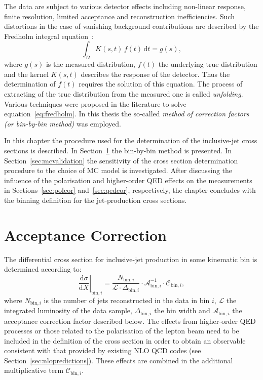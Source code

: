 The data are subject to various detector effects including non-linear response, finite resolution, limited acceptance and reconstruction inefficiencies. Such distortions in the case of vanishing background contributions are described by the Fredholm integral equation~\cite{Behnke:2013pga}:
\begin{equation}
 \int_\Omega K\left(s,t\right)\,f\left(t\right)\,\mathrm{d}t = g\left(s\right),
 \label{eq:fredholm}
\end{equation}
where $g\left(s\right)$ is the measured distribution, $f\left(t\right)$ the underlying true distribution and the kernel $K\left(s,t\right)$ describes the response of the detector. Thus the determination of $f\left(t\right)$ requires the solution of this equation.
The process of extracting of the true distribution from the measured one is called \emph{unfolding}. Various techniques were proposed in the literature to solve equation~\ref{eq:fredholm}. In this thesis the so-called \emph{method of correction factors (or bin-by-bin method)} was employed.

In this chapter the procedure used for the determination of the inclusive-jet cross sections is described. In Section~\ref{sec:acccor} the bin-by-bin method is presented. In Section~\ref{sec:mcvalidation} the sensitivity of the cross section determination procedure to the choice of MC model is investigated. After discussing the influence of the polarisation and higher-order QED effects on the measurements in Sections~\ref{sec:polcor} and~\ref{sec:qedcor}, respectively, the chapter concludes with the binning definition for the jet-production cross sections.

\section{Acceptance Correction}
\label{sec:acccor}
The differential cross section for inclusive-jet production in some kinematic bin is determined according to:
\begin{equation}
 \left.\frac{\mathrm{d}\sigma}{\mathrm{d}X}\right|_{\mathrm{bin},i} = \frac{N_{\mathrm{bin},i}}{\mathcal{L} \cdot \Delta_{\mathrm{bin},i}} \cdot \mathcal{A}^{-1}_{\mathrm{bin},i} \cdot \mathcal{C}_{\mathrm{bin},i},
 \label{eq:csdef}
\end{equation}
where $N_{\mathrm{bin},i}$ is the number of jets reconstructed in the data in bin $i$, $\mathcal{L}$ the integrated luminosity of the data sample, $\Delta_{\mathrm{bin},i}$ the bin width and $\mathcal{A}_{\mathrm{bin},i}$ the acceptance correction factor described below. The effects from higher-order QED processes or those related to the polarisation of the lepton beam need to be included in the definition of the cross section in order to obtain an observable consistent with that provided by existing NLO QCD codes (see Section~\ref{sec:nlopredictions}). These effects are combined in the additional multiplicative term $\mathcal{C}_{\mathrm{bin},i}$.

